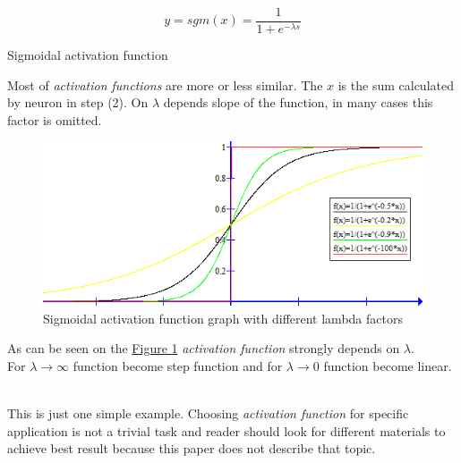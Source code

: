 \begin{mycapequ}[!ht]
    $$y = sgm(x) = \frac{1}{1+e^{-\lambda s}}$$
    \caption{Sigmoidal activation function \cite{mlpFSaC}}
    \label{formula:SigmoidalActivationFunction}
\end{mycapequ}

Most of \textit{activation functions} are more or less similar. The $x$ is the sum calculated by neuron in step (2). On $\lambda$ depends slope of the function, in many cases this factor is omitted. 

\newpage

\begin{figure}[!h]
    \centering
    \includegraphics[scale=1]{Media/sgm_graph.png}
    \caption[Sigmoidal activation function graph]{Sigmoidal activation function graph with different lambda factors}
    \label{fig:SigmoidalFunctionGraph}
\end{figure}

As can be seen on the \hyperref[fig:SigmoidalFunctionGraph]{Figure \ref{fig:SigmoidalFunctionGraph}} \textit{activation function} strongly depends on $\lambda$. \\
For $\lambda \rightarrow \infty$ function become step function and for $\lambda \rightarrow 0$ function become linear.

\ \\

This is just one simple example. Choosing \textit{activation function} for specific application is not a trivial task and reader should look for different materials to achieve best result because this paper does not describe that topic.
